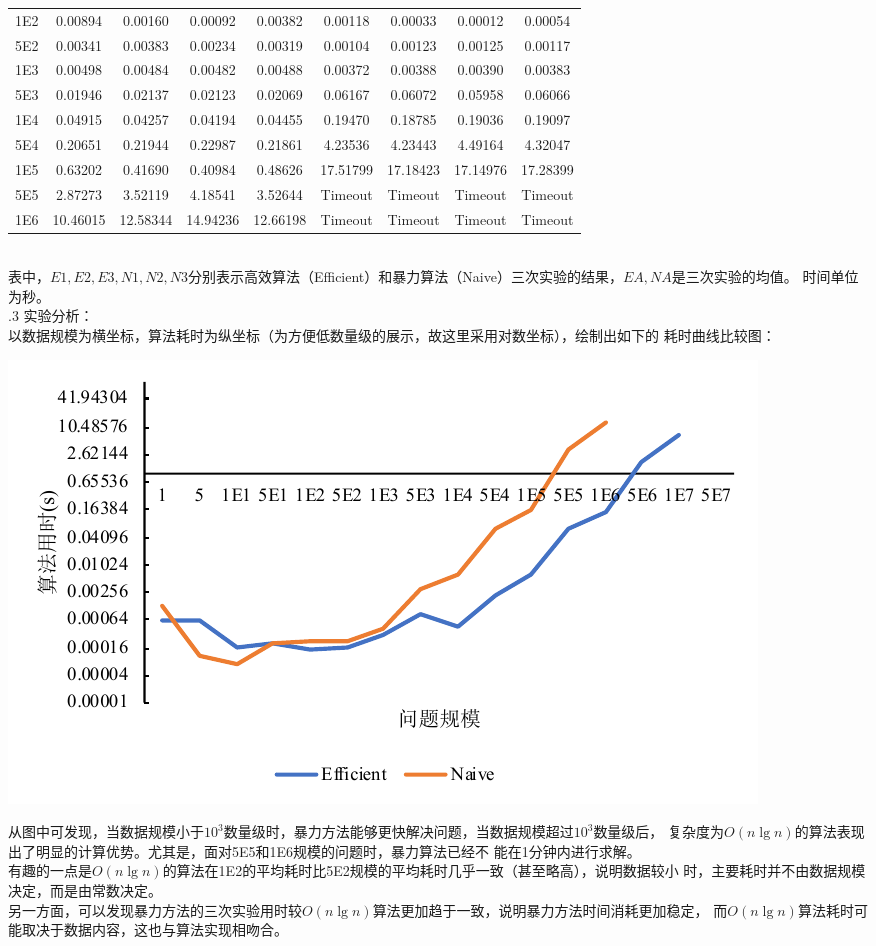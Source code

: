 \documentclass[a4paper]{article}
\begin{document}
\begin{enumerate}
{\begin{tabular}{c||ccc|c||ccc|c}
    1E2&0.00894 &0.00160 &0.00092 &0.00382 &0.00118 &0.00033 &0.00012 &0.00054\\
    5E2&0.00341 &0.00383 &0.00234 &0.00319 &0.00104 &0.00123 &0.00125 &0.00117\\
    1E3&0.00498 &0.00484 &0.00482 &0.00488 &0.00372 &0.00388 &0.00390 &0.00383\\
    5E3&0.01946 &0.02137 &0.02123 &0.02069 &0.06167 &0.06072 &0.05958 &0.06066\\
    1E4&0.04915 &0.04257 &0.04194 &0.04455 &0.19470 &0.18785 &0.19036 &0.19097\\
    5E4&0.20651 &0.21944 &0.22987 &0.21861 &4.23536 &4.23443 &4.49164 &4.32047\\
    1E5&0.63202 &0.41690 &0.40984 &0.48626 &17.51799 &17.18423 &17.14976 &17.28399 \\
    5E5&2.87273 &3.52119 &4.18541 &3.52644 &Timeout &Timeout &Timeout &Timeout\\
    1E6&10.46015 &12.58344 &14.94236 &12.66198  &Timeout &Timeout &Timeout &Timeout\\
    \hline\hline
  \end{tabular}
  }\\
  \medskip
  表中，$E1,E2,E3,N1,N2,N3$分别表示高效算法（Efficient）和暴力算法（Naive）三次实验的结果，$EA,NA$是三次实验的均值。
  时间单位为秒。\\
  .3 实验分析：\\
  以数据规模为横坐标，算法耗时为纵坐标（为方便低数量级的展示，故这里采用对数坐标），绘制出如下的
  耗时曲线比较图：
  \begin{center}
    \includegraphics[scale=0.8]{Pictures/Chart.pdf}
  \end{center}
  从图中可发现，当数据规模小于$10^3$数量级时，暴力方法能够更快解决问题，当数据规模超过$10^3$数量级后，
  复杂度为$O(n \lg n)$的算法表现出了明显的计算优势。尤其是，面对5E5和1E6规模的问题时，暴力算法已经不
  能在1分钟内进行求解。\\
  有趣的一点是$O(n \lg n)$的算法在1E2的平均耗时比5E2规模的平均耗时几乎一致（甚至略高），说明数据较小
  时，主要耗时并不由数据规模决定，而是由常数决定。\\
  另一方面，可以发现暴力方法的三次实验用时较$O(n \lg n)$算法更加趋于一致，说明暴力方法时间消耗更加稳定，
  而$O(n \lg n)$算法耗时可能取决于数据内容，这也与算法实现相吻合。
\end{enumerate}
\end{document}
